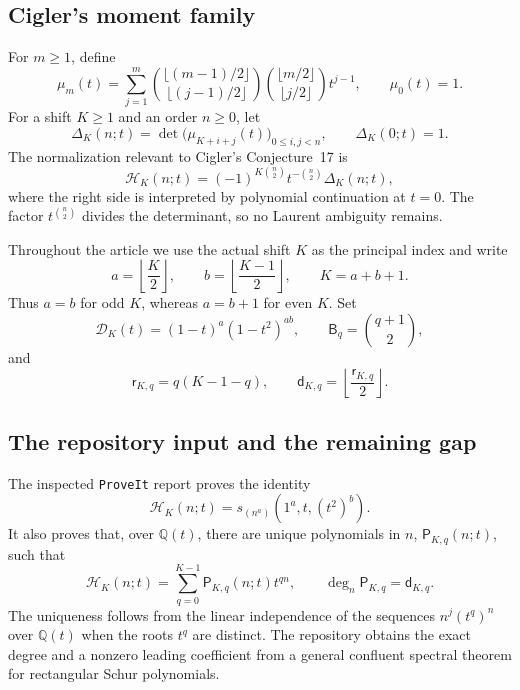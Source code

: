\documentclass[11pt]{article}
\theoremstyle{definition}
\theoremstyle{remark}
\newcommand{\Q}{\mathbb Q}
\newcommand{\Ht}{\mathcal H}
\newcommand{\Den}{\mathcal D}
\newcommand{\Pblock}{\mathsf P}
\newcommand{\Btri}{\mathsf B}
\newcommand{\dq}{\mathsf d}
\newcommand{\rdeg}{\mathsf r}
\theoremstyle{definition}
\theoremstyle{plain}
\numberwithin{equation}{section}
\begin{document}
\subsection{Cigler's moment family}
For $m\ge1$, define
\begin{equation}
 \mu_m(t)=
 \sum_{j=1}^{m}
 \binom{\lfloor(m-1)/2\rfloor}{\lfloor(j-1)/2\rfloor}
 \binom{\lfloor m/2\rfloor}{\lfloor j/2\rfloor}t^{j-1},
 \qquad \mu_0(t)=1.
 \label{sb:eq:moments}
\end{equation}
For a shift $K\ge1$ and an order $n\ge0$, let
\begin{equation}
 \Delta_K(n;t)=\det\bigl(\mu_{K+i+j}(t)\bigr)_{0\le i,j<n},
 \qquad \Delta_K(0;t)=1.
 \label{sb:eq:hankel}
\end{equation}
The normalization relevant to Cigler's Conjecture~17 is
\begin{equation}
 \Ht_K(n;t)=(-1)^{K\binom n2}t^{-\binom n2}\Delta_K(n;t),
 \label{sb:eq:normalized-hankel}
\end{equation}
where the right side is interpreted by polynomial continuation at $t=0$.
The factor $t^{\binom n2}$ divides the determinant, so no Laurent ambiguity
remains.

Throughout the article we use the actual shift $K$ as the principal index and
write
\begin{equation}
 a=\left\lfloor\frac K2\right\rfloor,
 \qquad
 b=\left\lfloor\frac{K-1}{2}\right\rfloor,
 \qquad K=a+b+1.
 \label{sb:eq:ab}
\end{equation}
Thus $a=b$ for odd $K$, whereas $a=b+1$ for even $K$.  Set
\begin{equation}
 \Den_K(t)=(1-t)^a(1-t^2)^{ab},
 \qquad
 \Btri_q=\binom{q+1}{2},
 \label{sb:eq:D-and-B}
\end{equation}
and
\begin{equation}
 \rdeg_{K,q}=q(K-1-q),
 \qquad
 \dq_{K,q}=\left\lfloor\frac{\rdeg_{K,q}}2\right\rfloor.
 \label{sb:eq:r-and-d}
\end{equation}

\subsection{The repository input and the remaining gap}
\label{sb:sec:input}
The inspected \texttt{ProveIt} report proves the identity
\begin{equation}
 \boxed{\Ht_K(n;t)=s_{(n^a)}(1^a,t,(t^2)^b).}
 \label{sb:eq:schur-identity}
\end{equation}
It also proves that, over $\Q(t)$, there are unique polynomials in $n$,
$\Pblock_{K,q}(n;t)$, such that
\begin{equation}
 \Ht_K(n;t)=\sum_{q=0}^{K-1}\Pblock_{K,q}(n;t)t^{qn},
 \qquad
 \deg_n\Pblock_{K,q}=\dq_{K,q}.
 \label{sb:eq:existing-spectral}
\end{equation}
The uniqueness follows from the linear independence of the sequences
$n^j(t^q)^n$ over $\Q(t)$ when the roots $t^q$ are distinct.  The repository
obtains the exact degree and a nonzero leading coefficient from a general
confluent spectral theorem for rectangular Schur polynomials.
\end{document}
